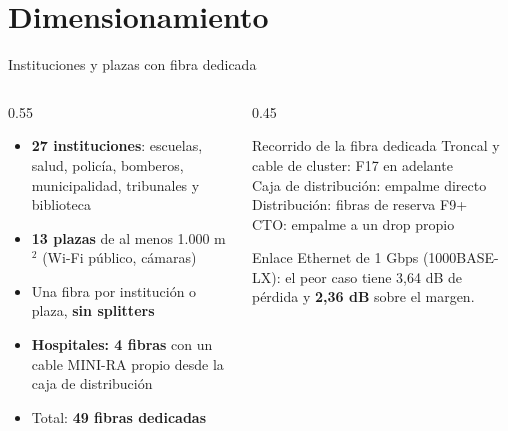 \section[P2: Dimension.]{Dimensionamiento}
\begin{frame}{Instituciones y plazas con fibra dedicada}
  \begin{columns}[T]
    \begin{column}{0.55\textwidth}
      \small
      \begin{itemize}
        \item \textbf{27 instituciones}: escuelas, salud, policía, bomberos, municipalidad, tribunales y biblioteca
        \item \textbf{13 plazas} de al menos 1.000 m$^2$ (Wi-Fi público, cámaras)
        \item Una fibra por institución o plaza, \textbf{sin splitters}
        \item \textbf{Hospitales: 4 fibras} con un cable MINI-RA propio desde la caja de distribución
        \item Total: \textbf{49 fibras dedicadas}
      \end{itemize}
    \end{column}
    \begin{column}{0.45\textwidth}
      \begin{block}{Recorrido de la fibra dedicada}
        \footnotesize
        Troncal y cable de cluster: F17 en adelante\\
        Caja de distribución: empalme directo\\
        Distribución: fibras de reserva F9+\\
        CTO: empalme a un drop propio
      \end{block}
      \footnotesize Enlace Ethernet de 1 Gbps (1000BASE-LX): el peor caso tiene 3,64 dB de pérdida y \textbf{2,36 dB} sobre el margen.
    \end{column}
  \end{columns}
\end{frame}

